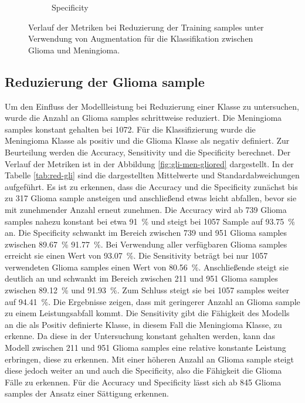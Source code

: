 \begin{figure}[H]
\begin{subfigure}[b]{0.48\textwidth}
    \caption{Specificity}
    \label{fig:augm-spec}
  \end{subfigure}
  \caption{Verlauf der Metriken bei Reduzierung der Training samples unter Verwendung von Augmentation für die Klassifikation zwischen Glioma und Meningioma.}
  \label{fig:gli-men-augm}
\end{figure}
\subsection{Reduzierung der Glioma sample}
Um den Einfluss der Modellleistung bei Reduzierung einer Klasse zu untersuchen, wurde die Anzahl an Glioma samples schrittweise reduziert.
Die Meningioma samples konstant gehalten bei 1072.
Für die Klassifizierung wurde die Meningioma Klasse als positiv und die Glioma Klasse als negativ definiert. 
Zur Beurteilung werden die Accuracy, Sensitivity und die Specificity berechnet.
Der Verlauf der Metriken ist in der Abbildung \ref{fig:gli-men-gliored} dargestellt.
In der Tabelle \ref{tab:red-gli} sind die dargestellten Mittelwerte und Standardabweichungen aufgeführt. 
Es ist zu erkennen, dass die Accuracy und die Specificity zunächst bis zu 317 Glioma sample ansteigen und anschließend etwas leicht abfallen,
bevor sie mit zunehmender Anzahl erneut zunehmen. 
Die Accuracy wird ab 739 Glioma samples nahezu konstant bei etwa \SI{91}{\percent} und steigt bei 1057 Sample auf \SI{93.75}{\percent} an.
Die Specificity schwankt im Bereich zwischen 739 und 951 Glioma samples zwischen \SI{89.67}{\%} \SI{91.77}{\%}.
Bei Verwendung aller verfügbaren Glioma samples erreicht sie einen Wert von \SI{93.07}{\%}.
Die Sensitivity beträgt bei nur 1057 verwendeten Glioma samples einen Wert von \SI{80.56}{\%}.
Anschließende steigt sie deutlich an und schwankt im Bereich zwischen 211 und 951 Glioma samples zwischen \SI{89.12}{\%} und \SI{91.93}{\%}. 
Zum Schluss steigt sie bei 1057 samples weiter auf \SI{94.41}{\%}.
Die Ergebnisse zeigen, dass mit geringerer Anzahl an Glioma sample zu einem Leistungsabfall kommt.
Die Sensitivity gibt die Fähigkeit des Modells an die als Positiv definierte Klasse, in diesem Fall die Meningioma Klasse, zu erkenne.
Da diese in der Untersuchung konstant gehalten werden, kann das Modell zwischen 211 und 951 Glioma samples eine relative konstante Leistung erbringen, diese zu erkennen.
Mit einer höheren Anzahl an Glioma sample steigt diese jedoch weiter an und auch die Specificity, also die Fähigkeit die Glioma Fälle zu erkennen.
Für die Accuracy und Specificity lässt sich ab 845 Glioma samples der Ansatz einer Sättigung erkennen. 
